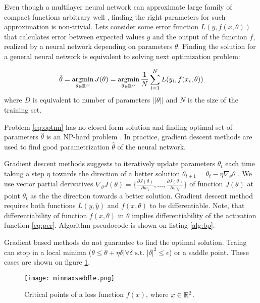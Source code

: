 Even though a multilayer neural network can approximate large family of compact functions arbitrary well \cite{Debao1993}, finding the right parameters for such approximation is non-trivial.
Lets consider some error function $L(y, f(x, \theta))$ that calculates error between expected values $y$ and the output of the function $f$, realized by a neural network depending on parameters $\theta$. Finding the solution for a general neural network is equivalent to solving next optimization problem:

\begin{equation}\label{eq:optnn}
  \hat{\theta} = \operatorname*{argmin}_{\theta \in \Bbb{R}^D} J(\theta) = \operatorname*{argmin}_{\theta \in \Bbb{R}^D} \frac{1}{N} \sum_{i=1}^{N} L(y_i, f(x_i, \theta))
\end{equation}
where $D$ is equivalent to number of parameters $||\theta||$ and $N$ is the size of the training set.

Problem \ref{eq:optnn} has no closed-form solution and finding optimal set of parameters $\hat{\theta}$ is an NP-hard problem \cite{Anandkumar16}.
In practice, gradient descent methods are used to find good parametrization $\hat{\theta}$ of the neural network.

Gradient descent methods suggests to iteratively update parameters $\theta_t$ each time taking a step $\eta$ towards the direction of a better solution $\theta_{t+1}=\theta_t - \eta \nabla_\theta \theta$ \cite{Cauchy1847}.
We use vector partial derivatives $\nabla_\theta J(\theta)=\{ \frac{\partial J(\theta)}{\partial w_1}, \ldots, \frac{\partial J(\theta)}{\partial w_N} \}$ of function $J(\theta)$ at point $\theta_t$ as the the direction towards a better solution. Gradient descent method requires both functions $L(y, \hat{y})$ and $f(x, \theta)$ to be differentiable. Note, that differentiability of function $f(x, \theta)$ in $\theta$ implies differentiability of the activation function \ref{eq:per}. Algorithm pseudocode is shown on listing \ref{alg:bp}.



Gradient based methods do not guarantee to find the optimal solution.
Traing can stop in a local minima ($\theta \leq \theta + \eta \delta | \forall \delta \text{ s.t. } |\delta|^2 \leq \epsilon$) or a saddle point.
These cases are shown on figure \ref{fig:critical}.

\begin{figure}[h!]
  \centering
    \texttt{[image: minmaxsaddle.png]}
  \caption{Critical points of a loss function $f(x)$, where $x \in \Bbb{R}^2$.}
  \label{fig:critical}
\end{figure}

